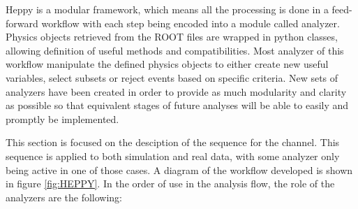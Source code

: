Heppy is a modular framework, which means all the processing is done in a feed-forward workflow with each step being encoded into a module called analyzer. Physics objects retrieved from the ROOT files are wrapped in python classes, allowing definition of useful methods and compatibilities. Most analyzer of this workflow manipulate the defined physics objects to either create new useful variables, select subsets or reject events based on specific criteria. New sets of analyzers have been created in order to provide as much modularity and clarity as possible so that equivalent stages of future analyses will be able to easily and promptly be implemented.

This section is focused on the desciption of the sequence for the \tauh\tauh channel. This sequence is applied to both simulation and real data, with some analyzer only being active in one of those cases. A diagram of the workflow developed is shown in figure \ref{fig:HEPPY}. In the order of use in the analysis flow, the role of the analyzers are the following:
